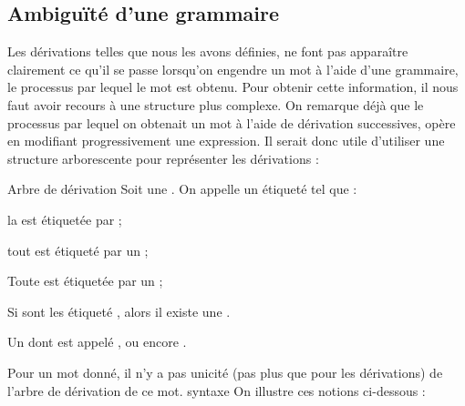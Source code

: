 \documentclass[a4paper,french,bookmarks]{book}
\begin{document}
    \subsection{Ambiguïté d'une grammaire}
    
    Les dérivations telles que nous les avons définies, ne font pas apparaître clairement ce qu'il se passe lorsqu'on engendre un mot à l'aide d'une grammaire, \ie le processus par lequel le mot est obtenu.
    Pour obtenir cette information, il nous faut avoir recours à une structure plus complexe. On remarque déjà que le processus par lequel on obtenait un mot à l'aide de dérivation successives, opère en modifiant progressivement une expression. Il serait donc utile d'utiliser une structure arborescente pour représenter les dérivations :
    
    \begin{definition}{Arbre de dérivation}{}
        Soit  une . On appelle  un  étiqueté tel que :
        \begin{enumerate}
            \itast la  est étiquetée par  ;
            
            \itast tout  est étiqueté par un  ;
            
            \itast Toute  est étiquetée par un  ;
            
            \itast Si  sont les  étiqueté , alors il existe une .
        \end{enumerate}
        Un  dont  est appelé ,  ou encore .
    \end{definition}
    Pour un mot donné, il n'y a pas unicité (pas plus que pour les dérivations) de l'arbre de dérivation de ce mot. syntaxe On illustre ces notions ci-dessous :
\end{document}
